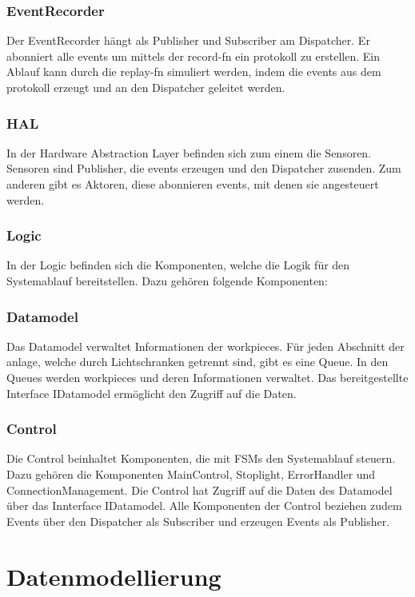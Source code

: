 \subsubsection{EventRecorder}
Der EventRecorder hängt als Publisher und Subscriber am Dispatcher.
Er abonniert alle \glspl{event} um mittels der \gls{record-fn} ein \gls{protokoll} zu erstellen.
Ein Ablauf kann durch die \gls{replay-fn} simuliert werden,
indem die \glspl{event} aus dem \gls{protokoll} erzeugt und an den Dispatcher geleitet werden.

\subsubsection{HAL}
In der Hardware Abstraction Layer befinden sich zum einem die Sensoren.
Sensoren sind Publisher, die \glspl{event} erzeugen und den Dispatcher zusenden.
Zum anderen gibt es Aktoren, diese abonnieren \glspl{event}, mit denen sie angesteuert werden.

\subsubsection{Logic}
In der Logic befinden sich die Komponenten, welche die Logik für den Systemablauf bereitstellen.
Dazu gehören folgende Komponenten:

\subsubsection{Datamodel}
Das Datamodel verwaltet Informationen der \glspl{workpiece}.
Für jeden Abschnitt der \gls{anlage}, welche durch Lichtschranken getrennt sind, gibt es eine Queue.
In den Queues werden \glspl{workpiece} und deren Informationen verwaltet.
Das bereitgestellte Interface IDatamodel ermöglicht den Zugriff auf die Daten.

\subsubsection{Control}
Die Control beinhaltet Komponenten, die mit FSMs den Systemablauf steuern.
Dazu gehören die Komponenten MainControl, Stoplight, ErrorHandler und ConnectionManagement.
Die Control hat Zugriff auf die Daten des Datamodel über das Innterface IDatamodel.
Alle Komponenten der Control beziehen zudem Events über den Dispatcher als Subscriber und erzeugen Events als Publisher.



\section{Datenmodellierung}\label{sec:datenmodellierung}

